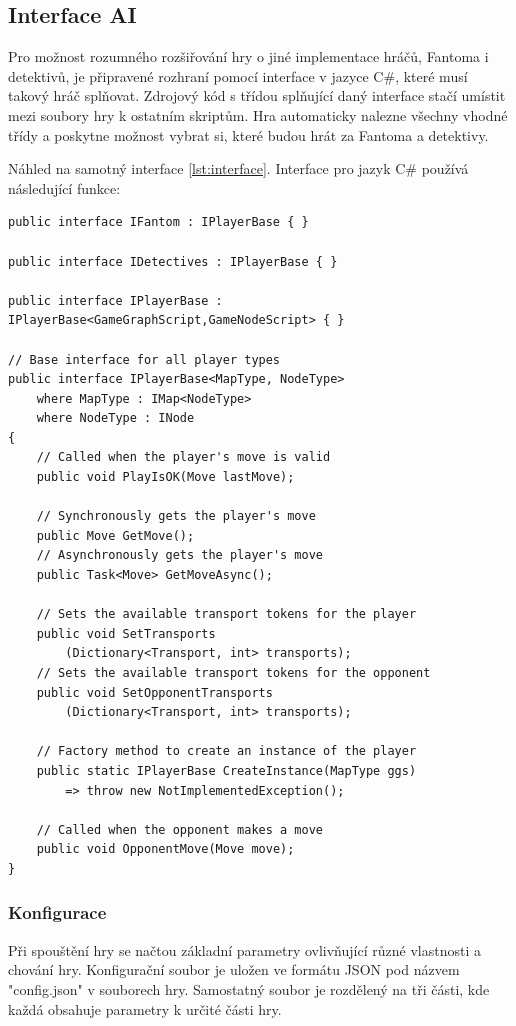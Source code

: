 \subsection{Interface AI}
Pro možnost rozumného rozšiřování hry o jiné implementace hráčů, Fantoma i detektivů, je připravené rozhraní pomocí interface v jazyce C\#, které musí takový hráč splňovat. Zdrojový kód s třídou splňující daný interface stačí umístit mezi soubory hry k ostatním skriptům. Hra automaticky nalezne všechny vhodné třídy a poskytne možnost vybrat si, které budou hrát za Fantoma a detektivy.

Náhled na samotný interface \ref{lst:interface}. Interface pro jazyk C\# používá následující funkce:


\begin{lstlisting}[language={[Sharp]C}, label={lst:interface}, caption={Definice rozhraní pro hráče}]
public interface IFantom : IPlayerBase { }

public interface IDetectives : IPlayerBase { }

public interface IPlayerBase : 
IPlayerBase<GameGraphScript,GameNodeScript> { }

// Base interface for all player types
public interface IPlayerBase<MapType, NodeType>
    where MapType : IMap<NodeType>
    where NodeType : INode
{
    // Called when the player's move is valid
    public void PlayIsOK(Move lastMove);

    // Synchronously gets the player's move
    public Move GetMove();
    // Asynchronously gets the player's move
    public Task<Move> GetMoveAsync();

    // Sets the available transport tokens for the player
    public void SetTransports
        (Dictionary<Transport, int> transports);
    // Sets the available transport tokens for the opponent
    public void SetOpponentTransports
        (Dictionary<Transport, int> transports);

    // Factory method to create an instance of the player
    public static IPlayerBase CreateInstance(MapType ggs)
        => throw new NotImplementedException();

    // Called when the opponent makes a move
    public void OpponentMove(Move move);
}
\end{lstlisting}


\subsubsection{Konfigurace}
Při spouštění hry se načtou základní parametry ovlivňující různé vlastnosti a chování hry. Konfigurační soubor je uložen ve formátu JSON pod názvem "config.json" v souborech hry. Samostatný soubor je rozdělený na tři části, kde každá obsahuje parametry k určité části hry.  

